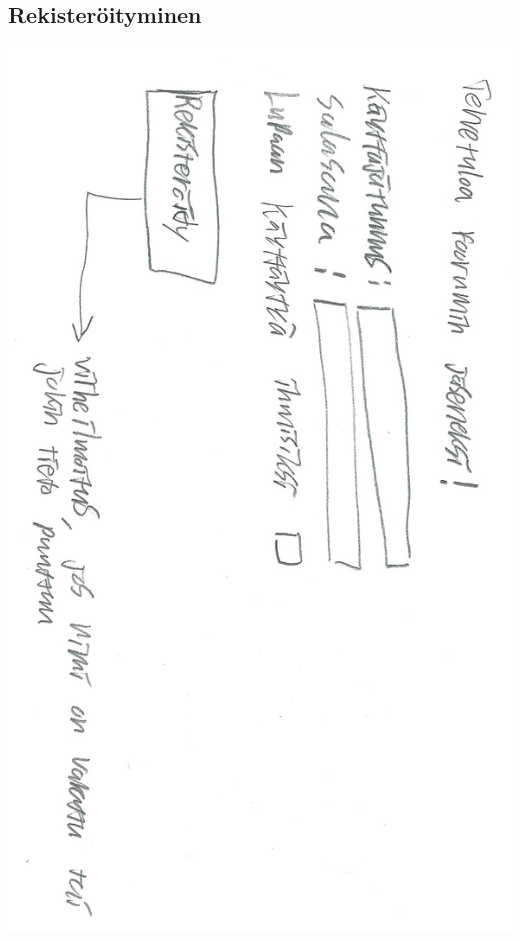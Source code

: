 \documentclass[a4paper, 12pt, finnish]{article}
\begin{document}
\subsection{Rekisteröityminen}
\includegraphics[width=\textwidth,height=\textheight,keepaspectratio]{rekisteroityminen.png}
\end{document}
